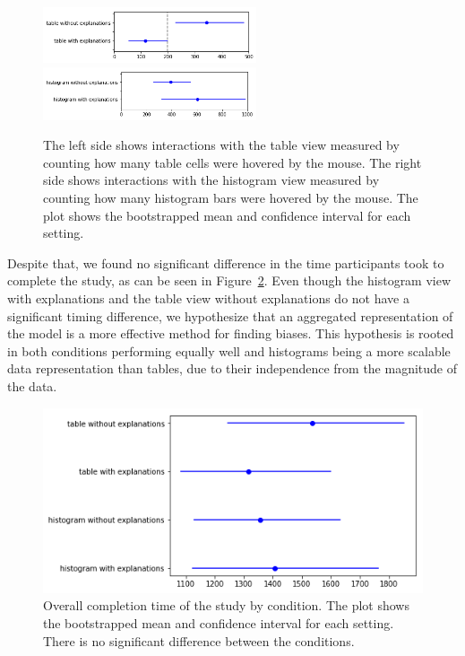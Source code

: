 \begin{figure}
\centering
\includegraphics[width=17em]{aggexplain/stats/table_interaction}%
\hfill%
\includegraphics[width=17em]{aggexplain/stats/histogram_interaction}%
\caption[Interactions with the table and histogram views.]{
The left side shows interactions with the table view measured by counting how many table cells were hovered by the mouse.
The right side shows interactions with the histogram view measured by counting how many histogram bars were hovered by the mouse.
The plot shows the bootstrapped mean and confidence interval for each setting.
}
\label{figs:table_interaction}
\end{figure}

Despite that, we found no significant difference in the time participants took to complete the study, as can be seen in Figure~\ref{figs:timing}.
Even though the histogram view with explanations and the table view without explanations do not have a significant timing difference, we hypothesize that an aggregated representation of the model is a more effective method for finding biases.
This hypothesis is rooted in both conditions performing equally well and histograms being a more scalable data representation than tables, due to their independence from the magnitude of the data.

\begin{figure}
\centering
\includegraphics[width=0.5\linewidth]{aggexplain/stats/timings}
\caption[Overall completion time of the study by condition.]{
Overall completion time of the study by condition.
The plot shows the bootstrapped mean and confidence interval for each setting.
There is no significant difference between the conditions.
}
\label{figs:timing}
\end{figure}

